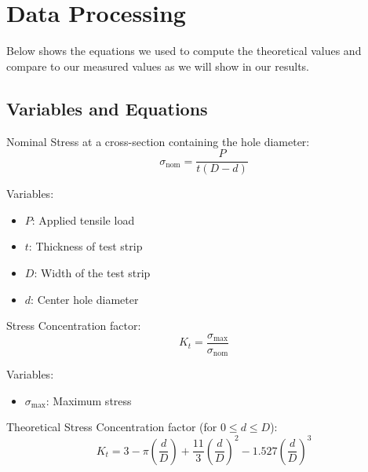\documentclass{article}
\begin{document}
\section{Data Processing}
Below shows the equations we used to compute the theoretical values and compare to our measured values as we will show in our results.

\subsection{Variables and Equations}  

Nominal Stress at a cross-section containing the hole diameter:
\begin{equation}
    \sigma_{\text{nom}} = \dfrac{P}{t(D-d)}
\end{equation}

Variables:
\begin{itemize}
    \item \(P\): Applied tensile load
    \item \(t\): Thickness of test strip
    \item \(D\): Width of the test strip
    \item \(d\): Center hole diameter
\end{itemize}
\vspace{5mm}

Stress Concentration factor:
\begin{equation}
    K_{t} = \dfrac{\sigma_{\text{max}}}{\sigma_{\text{nom}}}
\end{equation}

Variables:
\begin{itemize}
    \item \(\sigma_{\text{max}}\): Maximum stress
\end{itemize}
\vspace{5mm}

Theoretical Stress Concentration factor (for $0 \leq d \leq D$):
\begin{equation}
    K_{t} = 3 - \pi\left(\dfrac{d}{D}\right) + \frac{11}{3}\left(\dfrac{d}{D}\right)^{2} - 1.527\left(\dfrac{d}{D}\right)^{3} 
\end{equation}
\vspace{5mm}
\end{document}
